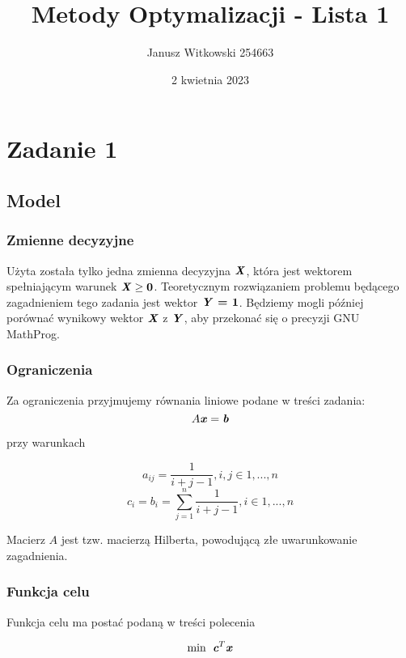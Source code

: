 \documentclass{article}
\title{Metody Optymalizacji - Lista 1}
\author{Janusz Witkowski 254663}
\date{2 kwietnia 2023}
\theoremstyle{definition}
\theoremstyle{remark}
\theoremstyle{plain}
\theoremstyle{remark}
\theoremstyle{plain}
\begin{document}
\maketitle

\section{Zadanie 1}
\subsection{Model}
\subsubsection{Zmienne decyzyjne}
Użyta została tylko jedna zmienna decyzyjna $\textbf{\textit{X}}$, która jest wektorem spełniającym warunek $\textbf{\textit{X}} \geq \textbf{0}$.
Teoretycznym rozwiązaniem problemu będącego zagadnieniem tego zadania jest wektor $\textbf{\textit{Y}} \textbf{ = 1} $.
Będziemy mogli później porównać wynikowy wektor $\textbf{\textit{X}}$ z $\textbf{\textit{Y}}$, aby przekonać się o precyzji GNU MathProg.

\subsubsection{Ograniczenia}
Za ograniczenia przyjmujemy równania liniowe podane w treści zadania:
\[A\textbf{\textit{x}}=\textbf{\textit{b}}\]

przy warunkach

\[a_{ij} = \frac{1}{i+j-1}, i,j \in 1,...,n\]
\[c_i = b_i = \sum_{j=1}^n{\frac{1}{i+j-1}}, i \in 1,...,n\]

Macierz $A$ jest tzw. macierzą Hilberta, powodującą złe uwarunkowanie zagadnienia.

\subsubsection{Funkcja celu}
Funkcja celu ma postać podaną w treści polecenia 

\[ \min {\textit{{\textbf{ c}}}}^T \textbf{\textit{x}} \]
\end{document}
